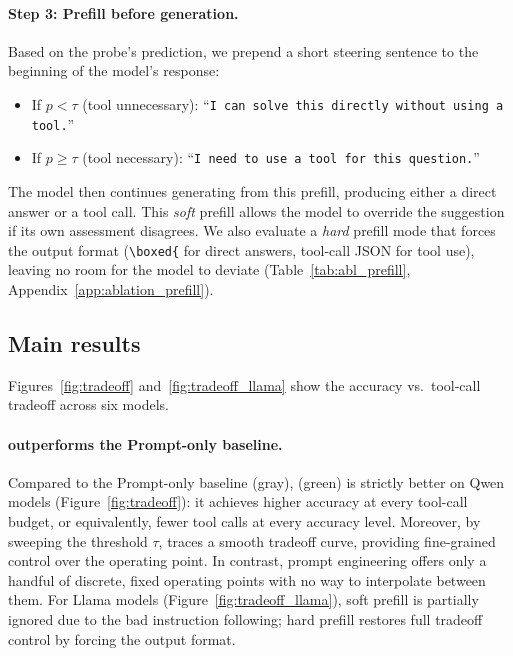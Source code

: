 \paragraph{Step 3: Prefill before generation.}
Based on the probe's prediction, we prepend a short steering sentence to the beginning of the model's response:
\begin{itemize}[leftmargin=*]
    \vspace{-3pt}
    \item If $p < \tau$ (tool unnecessary): ``\texttt{I can solve this directly without using a tool.}''
    \vspace{-3pt}
    \item If $p \geq \tau$ (tool necessary): ``\texttt{I need to use a tool for this question.}''
    \vspace{-3pt}
\end{itemize}
The model then continues generating from this prefill, producing either a direct answer or a tool call. This \emph{soft} prefill allows the model to override the suggestion if its own assessment disagrees. We also evaluate a \emph{hard} prefill mode that forces the output format (\texttt{\textbackslash boxed\{} for direct answers, tool-call JSON for tool use), leaving no room for the model to deviate (Table~\ref{tab:abl_prefill}, Appendix~\ref{app:ablation_prefill}).


\subsection{Main results}

Figures~\ref{fig:tradeoff} and~\ref{fig:tradeoff_llama} show the accuracy vs.\ tool-call tradeoff across six models.

\paragraph{\method{} outperforms the Prompt-only baseline.}
Compared to the Prompt-only baseline (gray), \method{} (green) is strictly better on Qwen models (Figure~\ref{fig:tradeoff}): it achieves higher accuracy at every tool-call budget, or equivalently, fewer tool calls at every accuracy level. Moreover, by sweeping the threshold $\tau$, \method{} traces a smooth tradeoff curve, providing fine-grained control over the operating point. In contrast, prompt engineering offers only a handful of discrete, fixed operating points with no way to interpolate between them. For Llama models (Figure~\ref{fig:tradeoff_llama}), soft prefill is partially ignored due to the bad instruction following; hard prefill restores full tradeoff control by forcing the output format.


